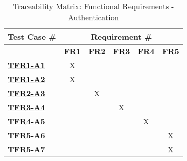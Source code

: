 \documentclass[12pt, titlepage]{article}
\begin{document}
\begin{table}[H]
    \centering
    \begin{adjustbox}{width=1\textwidth}
    \begin{tabular}{l|ccccc}
        \textbf{Test Case \#} & \multicolumn{5}{c}{\textbf{Requirement \#}}\\
        \hline
        ~ & \textbf{FR1} & \textbf{FR2} & \textbf{FR3} & \textbf{FR4} & \textbf{FR5} \\
        \hyperref[TFR1-A1]{\textbf{TFR1-A1}}  & X & ~ & ~ & ~ & ~ \\
        \hyperref[TFR1-A2]{\textbf{TFR1-A2}}  & X & ~ & ~ & ~ & ~ \\
        \hyperref[TFR2-A3]{\textbf{TFR2-A3}}  & ~ & X & ~ & ~ & ~ \\
        \hyperref[TFR3-A4]{\textbf{TFR3-A4}}  & ~ & ~ & X & ~ & ~ \\
        \hyperref[TFR4-A5]{\textbf{TFR4-A5}}  & ~ & ~ & ~ & X & ~ \\
        \hyperref[TFR5-A6]{\textbf{TFR5-A6}}  & ~ & ~ & ~ & ~ & X \\
        \hyperref[TFR5-A7]{\textbf{TFR5-A7}}  & ~ & ~ & ~ & ~ & X \\
    \end{tabular}
    \end{adjustbox}
    \caption{Traceability Matrix: Functional Requirements - Authentication}
    \label{table:TraceabilityMatrix}
\end{table}
\end{document}
